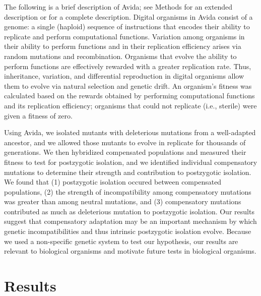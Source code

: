 \documentclass[11pt]{article}
\begin{document}
The following is a brief description of Avida;
see Methods for an extended description
or \cite{ofr04} for a complete description.
%
Digital organisms in Avida consist of a genome:
a single (haploid) sequence of instructions that encodes
their ability to replicate and perform computational functions.
%
Variation among organisms in their ability to perform functions
and in their replication efficiency
arises via random mutations and recombination.
%
Organisms that evolve the ability to perform functions
are effectively rewarded with a greater replication rate.
%
Thus, inheritance, variation, and differential reproduction
in digital organisms allow them to evolve
via natural selection and genetic drift.
%
An organism's fitness was calculated based on the rewards
obtained by performing computational functions and its replication efficiency;
organisms that could not replicate (i.e., sterile)
were given a fitness of zero.



Using Avida, we isolated mutants with deleterious mutations
from a well-adapted ancestor, and we allowed those mutants to evolve
in replicate for thousands of generations.
%
We then hybridized compensated populations and measured their fitness
to test for postzygotic isolation,
and we identified individual compensatory mutations to determine
their strength and contribution to postzygotic isolation.
%
We found that (1) postzygotic isolation occured between compensated populations,
(2) the strength of incompatibility among compensatory mutations
was greater than among neutral mutations, and
(3) compensatory mutations contributed as much as deleterious mutation
to postzygotic isolation.
%
Our results suggest that compensatory adaptation may be an important
mechanism by which genetic incompatibilities and
thus intrinsic postzygotic isolation evolve.
%
Because we used a non-specific genetic system to test our hypothesis,
our results are relevant to biological organisms and motivate
future tests in biological organisms.



\section*{Results}
\end{document}
